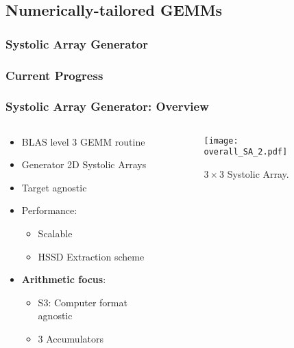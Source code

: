 \subsection{Numerically-tailored GEMMs}
\subsubsection{Systolic Array Generator}
\begin{frame}
    \frametitle{Current Progress}

    \tableofcontents[currentsection,
                     subsectionstyle=show/shaded/hide,
                     sectionstyle=show/hide]

\end{frame}

\begin{frame}
    \frametitle{Systolic Array Generator: Overview}

    \begin{columns}
        \begin{column}{0.5\textwidth}
            \begin{itemize}
                \item<1-> BLAS level 3 GEMM routine
                \item<1-> Generator 2D Systolic Arrays
                \item<1-> Target agnostic
                \item<2-> Performance:
                \begin{itemize}
		    \item Scalable
                    \item HSSD Extraction scheme
                \end{itemize}
		\item<3-> \textbf{Arithmetic focus}:
                \begin{itemize}
                    \item S3: Computer format agnostic
		    \item 3 Accumulators
                \end{itemize}
            \end{itemize}
        \end{column}

        \begin{column}{0.5\textwidth}
	    \begin{figure}[H]
            \centering
            \texttt{[image: overall\_SA\_2.pdf]}
            \caption{$3 \times 3$ Systolic Array.}
            \label{fig:overall_SA}
	    \end{figure}
        \end{column}
    \end{columns}
\end{frame}


